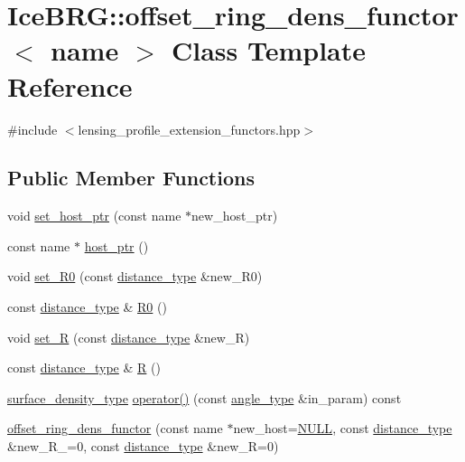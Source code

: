 \hypertarget{classIceBRG_1_1offset__ring__dens__functor}{\section{Ice\-B\-R\-G\-:\-:offset\-\_\-ring\-\_\-dens\-\_\-functor$<$ name $>$ Class Template Reference}
\label{classIceBRG_1_1offset__ring__dens__functor}
}


{\ttfamily \#include $<$lensing\-\_\-profile\-\_\-extension\-\_\-functors.\-hpp$>$}

\subsection*{Public Member Functions}
\begin{DoxyCompactItemize}
\item 
void \hyperlink{classIceBRG_1_1offset__ring__dens__functor_a11e9887925f22c6acf2ed3b8f78f89ce}{set\-\_\-host\-\_\-ptr} (const name $\ast$new\-\_\-host\-\_\-ptr)
\item 
const name $\ast$ \hyperlink{classIceBRG_1_1offset__ring__dens__functor_a0b94e34137310f46887a7cb7df9627de}{host\-\_\-ptr} ()
\item 
void \hyperlink{classIceBRG_1_1offset__ring__dens__functor_a4f8bf37c7e60aff1ef5329814f9beb95}{set\-\_\-\-R0} (const \hyperlink{namespaceIceBRG_a45499647eb87e24c10ab32c628711cec}{distance\-\_\-type} \&new\-\_\-\-R0)
\item 
const \hyperlink{namespaceIceBRG_a45499647eb87e24c10ab32c628711cec}{distance\-\_\-type} \& \hyperlink{classIceBRG_1_1offset__ring__dens__functor_a8a1ea1a37e86c825198036c95a0ee9e3}{R0} ()
\item 
void \hyperlink{classIceBRG_1_1offset__ring__dens__functor_aa3223071b9e65b71402ffefab2d83eb5}{set\-\_\-\-R} (const \hyperlink{namespaceIceBRG_a45499647eb87e24c10ab32c628711cec}{distance\-\_\-type} \&new\-\_\-\-R)
\item 
const \hyperlink{namespaceIceBRG_a45499647eb87e24c10ab32c628711cec}{distance\-\_\-type} \& \hyperlink{classIceBRG_1_1offset__ring__dens__functor_add4b837a1fd48884eafd829b3fbbce03}{R} ()
\item 
\hyperlink{namespaceIceBRG_a80c597ef5ba0a32491d32a9f0083b02d}{surface\-\_\-density\-\_\-type} \hyperlink{classIceBRG_1_1offset__ring__dens__functor_aabb2d2e6a0eb4d61e7ae3004afb70354}{operator()} (const \hyperlink{namespaceIceBRG_a688eeb0811a2474b20b667ed2e9625a1}{angle\-\_\-type} \&in\-\_\-param) const 
\item 
\hyperlink{classIceBRG_1_1offset__ring__dens__functor_ab587512a09eb711a807d57bd58acdcfe}{offset\-\_\-ring\-\_\-dens\-\_\-functor} (const name $\ast$new\-\_\-host=\hyperlink{lib_2IceBRG__main_2common_8h_a070d2ce7b6bb7e5c05602aa8c308d0c4}{N\-U\-L\-L}, const \hyperlink{namespaceIceBRG_a45499647eb87e24c10ab32c628711cec}{distance\-\_\-type} \&new\-\_\-\-R\-\_=0, const \hyperlink{namespaceIceBRG_a45499647eb87e24c10ab32c628711cec}{distance\-\_\-type} \&new\-\_\-\-R=0)
\end{DoxyCompactItemize}


